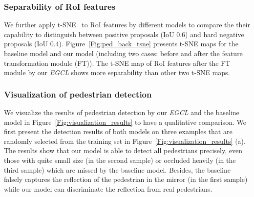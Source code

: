 \documentclass[journal]{IEEEtran}
\begin{document}
\subsubsection{Separability of RoI features} We further apply t-SNE~\cite{van2008visualizing} to RoI features by different models to compare the their capability to distinguish between positive proposals (IoU  0.6) and hard negative proposals (IoU  0.4). Figure~\ref{Fig:ped_back_tsne} presents t-SNE maps for the baseline model and our model (including two cases: before and after the feature transformation module (FT)). The t-SNE map of RoI features after the FT module by our \emph{EGCL} shows more separability than other two t-SNE maps.

\subsubsection{Visualization of pedestrian detection}
We visualize the results of pedestrian detection by our \emph{EGCL} and the baseline model in Figure~\ref{Fig:visualization_results} to have a qualitative comparison. We first present the detection results of both models on three examples that are randomly selected from the training set in Figure~\ref{Fig:visualization_results} (a). The results show that our model is able to detect all pedestrians precisely, even those with quite small size (in the second sample) or occluded heavily (in the third sample) which are missed by the baseline model. Besides, the baseline falsely captures the reflection of the pedestrian in the mirror (in the first sample) while our model can discriminate the reflection from real pedestrians.
\end{document}
